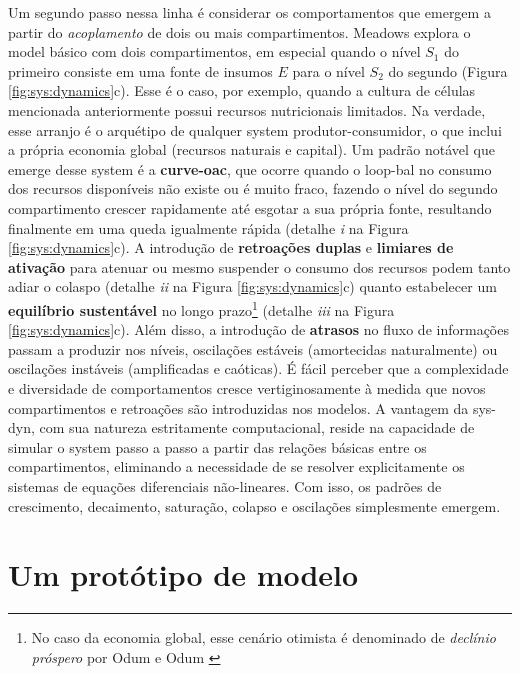 \documentclass[./main.tex]{subfiles}
\begin{document}
\par Um segundo passo nessa linha é considerar os comportamentos que emergem a partir do \textit{acoplamento} de dois ou mais compartimentos. Meadows explora o \gls{model} básico com dois compartimentos, em especial quando o nível $S_1$ do primeiro consiste em uma fonte de insumos $E$ para o nível $S_2$ do segundo (Figura \ref{fig:sys:dynamics}c). Esse é o caso, por exemplo, quando a cultura de células mencionada anteriormente possui recursos nutricionais limitados. Na verdade, esse arranjo é o arquétipo de qualquer \gls{system} produtor-consumidor, o que inclui a própria economia global (recursos naturais e capital). Um padrão notável que emerge desse \gls{system} é a \textbf{\gls{curve-oac}}, que ocorre quando o \gls{loop-bal} no consumo dos recursos disponíveis não existe ou é muito fraco, fazendo o nível do segundo compartimento crescer rapidamente até esgotar a sua própria fonte, resultando finalmente em uma queda igualmente rápida (detalhe \textrm{\textit{i}} na Figura \ref{fig:sys:dynamics}c). A introdução de \textbf{retroações duplas} e \textbf{limiares de ativação} para atenuar ou mesmo suspender o consumo dos recursos podem tanto adiar o colaspo (detalhe \textrm{\textit{ii}} na Figura \ref{fig:sys:dynamics}c) quanto estabelecer um \textbf{equilíbrio sustentável} no longo prazo\footnote{No caso da economia global, esse cenário otimista é denominado de \textit{declínio próspero} por Odum e Odum \cite{odum2008}} (detalhe \textrm{\textit{iii}} na Figura \ref{fig:sys:dynamics}c). Além disso, a introdução de \textbf{atrasos} no fluxo de informações passam a produzir nos níveis, oscilações estáveis (amortecidas naturalmente) ou oscilações instáveis (amplificadas e caóticas). É fácil perceber que a complexidade e diversidade de comportamentos cresce vertiginosamente à medida que novos compartimentos e retroações são introduzidas nos modelos. A vantagem da \gls{sys-dyn}, com sua natureza estritamente computacional, reside na capacidade de simular o \gls{system} passo a passo a partir das relações básicas entre os compartimentos, eliminando a necessidade de se resolver explicitamente os sistemas de equações diferenciais não-lineares. Com isso, os padrões de crescimento, decaimento, saturação, colapso e oscilações simplesmente emergem.

\section{Um protótipo de modelo} \label{sec:systems:model}
\end{document}
